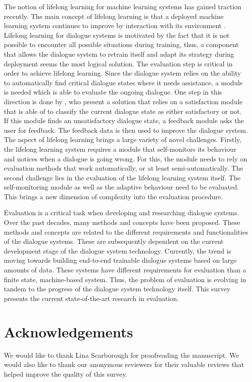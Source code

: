 The notion of lifelong learning for machine learning systems has gained traction recently. The main concept of lifelong learning is that a deployed machine learning system continues to improve by interaction with its environment . Lifelong learning for dialogue systems is motivated by the fact that it is not possible to encounter all possible situations during training, thus, a component that allows the dialogue system to retrain itself and adapt its strategy during deployment seems the most logical solution. 
The evaluation step is critical in order to achieve lifelong learning. Since the dialogue system relies on the ability to automatically find critical dialogue states where it needs assistance, a module is needed which is able to evaluate the ongoing dialogue. One step in this direction is done by , who present a solution that relies on a satisfaction module that is able of to classify the current dialogue state as either satisfactory or not. If this module finds an unsatisfactory dialogue state, a feedback module asks the user for feedback. The feedback data is then used to improve the dialogue system. 
The aspect of lifelong learning brings a large variety of novel challenges. Firstly, the lifelong learning system requires a module that self-monitors its behaviour and notices when a dialogue is going wrong. For this, the module needs to rely on evaluation methods that work automatically, or at least semi-automatically. The second challenge lies in the evaluation of the lifelong learning system itself. The self-monitoring module as well as the adaptive behaviour need to be evaluated. This brings a new dimension of complexity into the evaluation procedure.

Evaluation is a critical task when developing and researching dialogue systems. Over the past decades, many methods and concepts have been proposed. These methods and concepts are related to the different requirements and functionalities of the dialogue systems. These are subsequently dependent on the current development stage of the dialogue system technology. Currently, the trend is moving towards building end-to-end trainable dialogue systems based on large amounts of data. These systems have different requirements for evaluation than a finite state, machine-based system. Thus, the problem of evaluation is evolving in tandem to the progress of the dialogue system technology itself. This survey presents the current state-of-the-art research in evaluation.
\section*{Acknowledgements}
We would like to thank Lina Scarborough for proofreading the manuscript. We would also like to thank our anonymous reviewers for their valuable reviews that helped improve the quality of this survey. 

